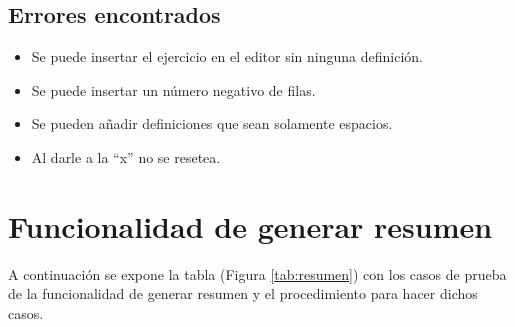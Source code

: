 \subsection{Errores encontrados}
\label{errores:definicion}
\begin{itemize}
    \item Se puede insertar el ejercicio en el editor sin ninguna definición.
    \item Se puede insertar un número negativo de filas.
    \item Se pueden añadir definiciones que sean solamente espacios.
    \item Al darle a la ``x'' no se resetea.
\end{itemize}


\section{Funcionalidad de generar resumen}
\label{planPruebas:resumen}
A continuación se expone la tabla (Figura \ref{tab:resumen}) con los casos de prueba de la funcionalidad de generar resumen y el procedimiento para hacer dichos casos.

